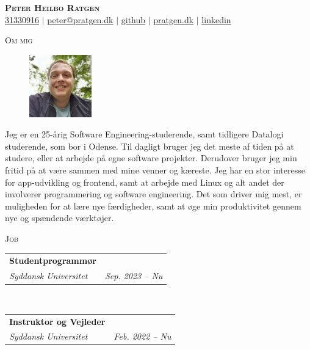 \documentclass[11pt]{article}
\makeatletter
\newcommand{\resumeSubheading}[4]{
  \noindent\begin{tabular*}{0.98\textwidth}[t]{l@{\extracolsep{\fill}}r}
    \noindent \textbf{#3} & \textit{\small #2} \\ \vspace{-3pt} 
    \noindent \textit{\small #1} & \textit{\small #4} 
  \end{tabular*}\vspace{7pt}
}
\makeatother
\begin{document}
\begin{center}
  \textbf{\huge{\scshape{Peter Heilbo Ratgen}}}\\ 
  \vspace{0.2cm}
  \small \href{tel:+4531330916}{31330916} $|$
  \href{mailto:peter@pratgen.dk}{\underline{peter@pratgen.dk}} $|$
  \href{https://github.com/ratgen }{\underline{github}} $|$
  \href{https://pratgen.dk}{\underline{pratgen.dk}} $|$
  \href{https://www.linkedin.com/in/peter-ratgen-a1236529/}{\underline{linkedin}}
\end{center}

\noindent\large{\scshape{Om mig}} \newline
\noindent{\rule[0.3cm]{\textwidth}{0.4pt}}

\begin{figure}
  \vspace{-0.7cm}
  \includegraphics[width=0.24\textwidth, right]{./profile.jpg}
\end{figure}
\normalsize Jeg er en 25-årig Software Engineering-studerende, samt tidligere
Datalogi studerende, som bor i Odense. Til dagligt bruger jeg det meste af tiden
på at studere, eller at arbejde på egne software projekter. Derudover bruger jeg
min fritid på at være sammen med mine venner og kæreste. Jeg har en stor
interesse for app-udvikling og frontend, samt at arbejde med Linux og alt andet
der involverer programmering og software engineering. Det som driver mig mest,
er muligheden for at lære nye færdigheder, samt at øge min produktivitet gennem
nye og spændende værktøjer.

\vspace{0.3cm}
\noindent\large{\scshape{Job}} \newline
\noindent{\rule[0.3cm]{\textwidth}{0.4pt}}

\resumeSubheading{Syddansk Universitet}{}{Studentprogrammør}{Sep. 2023 -- Nu}\\

\vspace{0.3cm}
\resumeSubheading{Syddansk Universitet}{}{Instruktor og Vejleder}{Feb. 2022 -- Nu}\\
\end{document}
